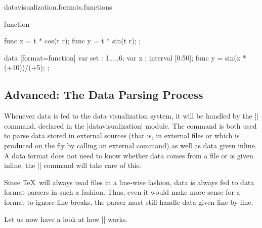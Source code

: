 \begin{tikzlibrary}{datavisualization.formats.functions}
\begin{dataformat}{function}
\begin{codeexample}[width=6cm]
{  func x = \value t * cos(\value t r);
  func y = \value t * sin(\value t r);
};
\end{codeexample}
\begin{codeexample}[width=7cm]
\tikz \datavisualization [
  scientific axes=clean,
  y axis={ticks={style={
        /pgf/number format/fixed,
        /pgf/number format/fixed zerofill,
        /pgf/number format/precision=2}}},
  x axis={ticks={tick suffix=${}^\circ$}},
  visualize as smooth line/.list={1,2,3,4,5,6},
  style sheet=vary hue]
data [format=function] {
  var set : {1,...,6};
  var x : interval [0:50];
  func y = sin(\value x * (\value{set}+10))/(\value{set}+5);
};
\end{codeexample}
    \end{dataformat}
\end{tikzlibrary}


\subsection{Advanced: The Data Parsing Process}
\label{section-dv-parsing}

Whenever data is fed to the data visualization system, it will be  handled by
the |\pgfdata| command, declared in the |datavisualization| module. The command
is both used to parse data stored in external sources (that is, in external
files or which is produced on the fly by calling an external command) as well
as data given inline. A data format does not need to know whether data comes
from a file or is given inline, the |\pgfdata| command will take care of this.

Since \TeX\ will always read files in a line-wise fashion, data is always fed
to data format parsers in such a fashion. Thus, even it would make more sense
for a format to ignore line-breaks, the parser must still handle data given
line-by-line.

Let us now have a look at how |\pgfdata| works.

